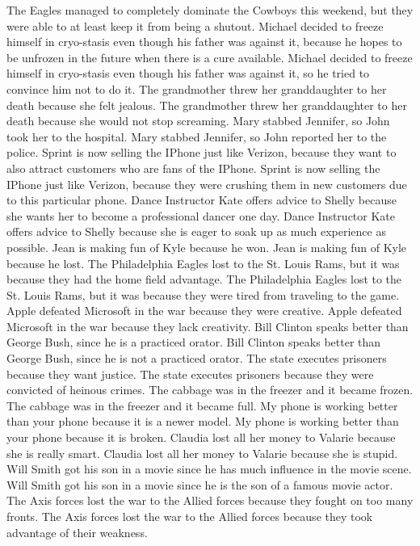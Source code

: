 \documentclass{article}
\begin{document}
\begin{enumerate}
	The Eagles managed to completely dominate the Cowboys this weekend, but they were able to at least keep it from being a shutout.
	Michael decided to freeze himself in cryo-stasis even though his father was against it, because he hopes to be unfrozen in the future when there is a cure available.
	Michael decided to freeze himself in cryo-stasis even though his father was against it, so he tried to convince him not to do it.
	The grandmother threw her granddaughter to her death because she felt jealous.
	The grandmother threw her granddaughter to her death because she would not stop screaming.
	Mary stabbed Jennifer, so John took her to the hospital.
	Mary stabbed Jennifer, so John reported her to the police.
	Sprint is now selling the IPhone just like Verizon, because they want to also attract customers who are fans of the IPhone.
	Sprint is now selling the IPhone just like Verizon, because they were crushing them in new customers due to this particular phone.
	Dance Instructor Kate offers advice to Shelly because she wants her to become a professional dancer one day.
	Dance Instructor Kate offers advice to Shelly because she is eager to soak up as much experience as possible.
	Jean is making fun of Kyle because he won.
	Jean is making fun of Kyle because he lost.
	The Philadelphia Eagles lost to the St. Louis Rams, but it was because they had the home field advantage.
	The Philadelphia Eagles lost to the St. Louis Rams, but it was because they were tired from traveling to the game.
	Apple defeated Microsoft in the war because they were creative.
	Apple defeated Microsoft in the war because they lack creativity.
	Bill Clinton speaks better than George Bush, since he is a practiced orator.
	Bill Clinton speaks better than George Bush, since he is not a practiced orator.
	The state executes prisoners because they want justice.
	The state executes prisoners because they were convicted of heinous crimes.
	The cabbage was in the freezer and it became frozen.
	The cabbage was in the freezer and it became full.
	My phone is working better than your phone because it is a newer model.
	My phone is working better than your phone because it is broken.
	Claudia lost all her money to Valarie because she is really smart.
	Claudia lost all her money to Valarie because she is stupid.
	Will Smith got his son in a movie since he has much influence in the movie scene.
	Will Smith got his son in a movie since he is the son of a famous movie actor.
	The Axis forces lost the war to the Allied forces because they fought on too many fronts.
	The Axis forces lost the war to the Allied forces because they took advantage of their weakness.

\end{enumerate}
\end{document}
